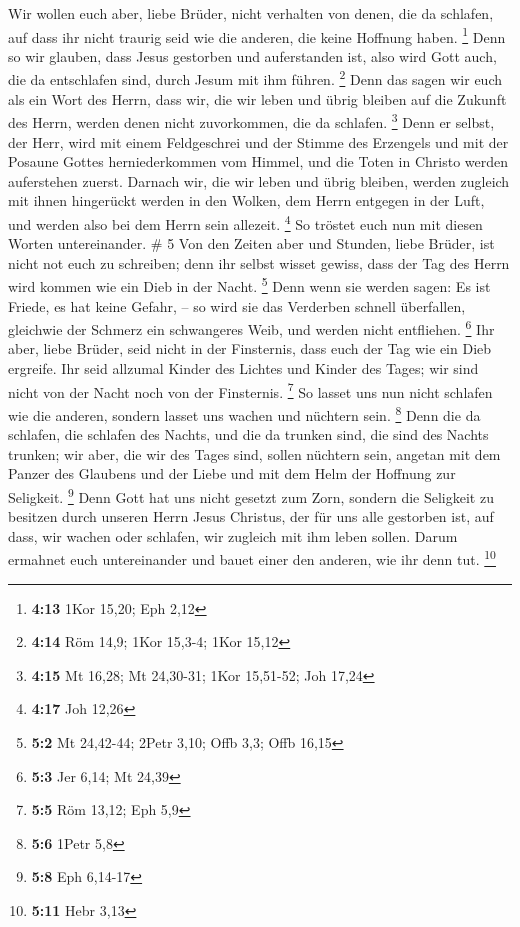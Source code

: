  Wir wollen euch aber, liebe Brüder, nicht verhalten von
denen, die da schlafen, auf dass ihr nicht traurig seid wie die anderen,
die keine Hoffnung haben. \footnote{\textbf{4:13} 1Kor 15,20; Eph 2,12}
 Denn so wir glauben, dass Jesus gestorben und
auferstanden ist, also wird Gott auch, die da entschlafen sind, durch
Jesum mit ihm führen. \footnote{\textbf{4:14} Röm 14,9; 1Kor 15,3-4;
  1Kor 15,12}  Denn das sagen wir euch als ein Wort des
Herrn, dass wir, die wir leben und übrig bleiben auf die Zukunft des
Herrn, werden denen nicht zuvorkommen, die da schlafen. \footnote{\textbf{4:15}
  Mt 16,28; Mt 24,30-31; 1Kor 15,51-52; Joh 17,24}  Denn
er selbst, der Herr, wird mit einem Feldgeschrei und der Stimme des
Erzengels und mit der Posaune Gottes herniederkommen vom Himmel, und die
Toten in Christo werden auferstehen zuerst.  Darnach wir,
die wir leben und übrig bleiben, werden zugleich mit ihnen hingerückt
werden in den Wolken, dem Herrn entgegen in der Luft, und werden also
bei dem Herrn sein allezeit. \footnote{\textbf{4:17} Joh 12,26}
 So tröstet euch nun mit diesen Worten untereinander. \#
5  Von den Zeiten aber und Stunden, liebe Brüder, ist
nicht not euch zu schreiben;  denn ihr selbst wisset
gewiss, dass der Tag des Herrn wird kommen wie ein Dieb in der Nacht.
\footnote{\textbf{5:2} Mt 24,42-44; 2Petr 3,10; Offb 3,3; Offb 16,15}
 Denn wenn sie werden sagen: Es ist Friede, es hat keine
Gefahr, -- so wird sie das Verderben schnell überfallen, gleichwie der
Schmerz ein schwangeres Weib, und werden nicht entfliehen. \footnote{\textbf{5:3}
  Jer 6,14; Mt 24,39}  Ihr aber, liebe Brüder, seid nicht
in der Finsternis, dass euch der Tag wie ein Dieb ergreife.
 Ihr seid allzumal Kinder des Lichtes und Kinder des
Tages; wir sind nicht von der Nacht noch von der Finsternis. \footnote{\textbf{5:5}
  Röm 13,12; Eph 5,9}  So lasset uns nun nicht schlafen
wie die anderen, sondern lasset uns wachen und nüchtern sein.
\footnote{\textbf{5:6} 1Petr 5,8}  Denn die da schlafen,
die schlafen des Nachts, und die da trunken sind, die sind des Nachts
trunken;  wir aber, die wir des Tages sind, sollen
nüchtern sein, angetan mit dem Panzer des Glaubens und der Liebe und mit
dem Helm der Hoffnung zur Seligkeit. \footnote{\textbf{5:8} Eph 6,14-17}
 Denn Gott hat uns nicht gesetzt zum Zorn, sondern die
Seligkeit zu besitzen durch unseren Herrn Jesus Christus,
 der für uns alle gestorben ist, auf dass, wir wachen
oder schlafen, wir zugleich mit ihm leben sollen.  Darum
ermahnet euch untereinander und bauet einer den anderen, wie ihr denn
tut. \footnote{\textbf{5:11} Hebr 3,13}

